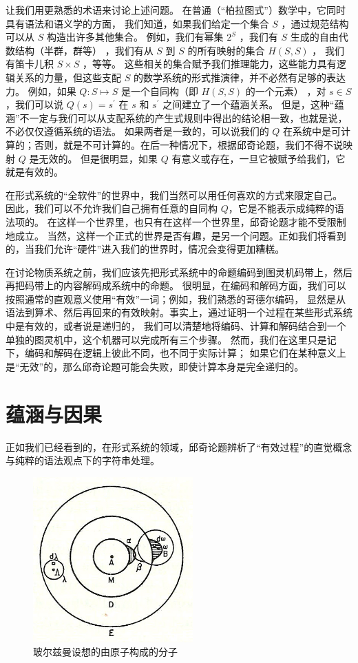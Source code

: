 \documentclass[a4paper,12pt]{article}
\begin{document}
让我们用更熟悉的术语来讨论上述问题。 在普通（“柏拉图式”）数学中，它同时具有语法和语义学的方面，
我们知道，如果我们给定一个集合 $S$ ，通过规范结构可以从 $S$ 构造出许多其他集合。
例如，我们有幂集 $2^S$ ，我们有 $S$ 生成的自由代数结构（半群，群等） ，我们有从 $S$ 到 $S$ 的所有映射的集合 $H(S, S)$ ，
我们有笛卡儿积 $S \times S$ ，等等。
这些相关的集合赋予我们推理能力，这些能力具有逻辑关系的力量，但这些支配 $S$ 的数学系统的形式推演律，并不必然有足够的表达力。
例如，如果 $Q: S \mapsto S$ 是一个自同构（即 $H(S, S)$ 的一个元素） ，对 $s \in S $，我们可以说 $Q(s) = s^{\prime}$ 在 $s$ 和 $s^{\prime}$ 之间建立了一个蕴涵关系。
但是，这种“蕴涵”不一定与我们可以从支配系统的产生式规则中得出的结论相一致，也就是说，不必仅仅遵循系统的语法。
如果两者是一致的，可以说我们的 $Q$ 在系统中是可计算的；否则，就是不可计算的。在后一种情况下，根据邱奇论题，我们不得不说映射 $Q$ 是无效的。
但是很明显，如果 $Q$ 有意义或存在，一旦它被赋予给我们，它就是有效的。

在形式系统的“全软件”的世界中，我们当然可以用任何喜欢的方式来限定自己。
因此，我们可以不允许我们自己拥有任意的自同构 $Q$，它是不能表示成纯粹的语法项的。
在这样一个世界里，也只有在这样一个世界里，邱奇论题才能不受限制地成立。
当然，这样一个正式的世界是否有趣，是另一个问题。正如我们将看到的，当我们允许“硬件”进入我们的世界时，情况会变得更加糟糕。

在讨论物质系统之前，我们应该先把形式系统中的命题编码到图灵机码带上，然后再把码带上的内容解码成系统中的命题。
很明显，在编码和解码方面，我们可以按照通常的直观意义使用“有效”一词；例如，我们熟悉的哥德尔编码，
显然是从语法到算术、然后再回来的有效映射。事实上，通过证明一个过程在某些形式系统中是有效的，或者说是递归的，
我们可以清楚地将编码、计算和解码结合到一个单独的图灵机中，这个机器可以完成所有三个步骤。
然而，我们在这里只是记下，编码和解码在逻辑上彼此不同，也不同于实际计算；
如果它们在某种意义上是“无效”的，那么邱奇论题可能会失败，即使计算本身是完全递归的。

\section{蕴涵与因果}

正如我们已经看到的，在形式系统的领域，邱奇论题辨析了“有效过程”的直觉概念与纯粹的语法观点下的字符串处理。

\begin{figure}[ht]
\centering
\includegraphics[height=2.5in]{images/boltzmanns_molecule.jpg}
\caption{玻尔兹曼设想的由原子构成的分子}
\end{figure}
\end{document}
